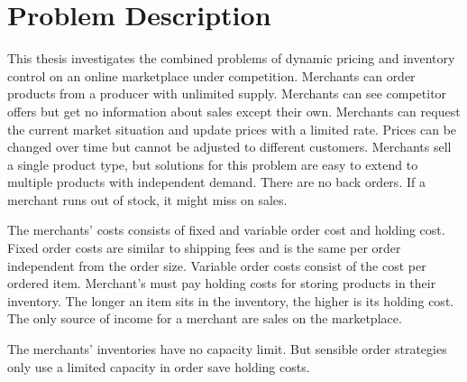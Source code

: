 
\chapter{Problem Description}
This thesis investigates the combined problems of dynamic pricing and inventory control on an online marketplace under competition.
Merchants can order products from a producer with unlimited supply. 
Merchants can see competitor offers but get no information about sales except their own.
Merchants can request the current market situation and update prices with a limited rate.
Prices can be changed over time but cannot be adjusted to different customers.
Merchants sell a single product type, but solutions for this problem are easy to extend to multiple products with independent demand.
There are no back orders. If a merchant runs out of stock, it might miss on sales.

The merchants' costs consists of fixed and variable order cost and holding cost.
Fixed order costs are similar to shipping fees and is the same per order independent from the order size.
Variable order costs consist of the cost per ordered item.
Merchant's must pay holding costs for storing products in their inventory.
The longer an item sits in the inventory, the higher is its holding cost. 
The only source of income for a merchant are sales on the marketplace.

The merchants' inventories have no capacity limit.
But sensible order strategies only use a limited capacity in order save holding costs.



